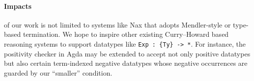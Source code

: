 \documentclass[a4paper]{easychair} %
\begin{document}
\paragraph{Impacts\!\!} of our work is not limited to
systems like Nax that adopts Mendler-style or type-based termination.
We hope to inspire other existing Curry--Howard based reasoning systems
to support datatypes like \verb|Exp : {Ty} -> *|.
For instance, the positivity checker in Agda may be extended to accept
not only positive datatypes but also certain term-indexed negative datatypes
whose negative occurrences are guarded by our ``smaller'' condition.

\end{document}
